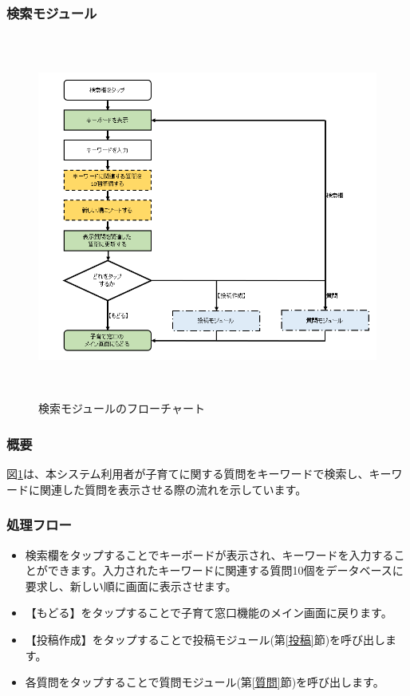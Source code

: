 \documentclass[a4j]{jarticle}
\begin{document}
\subsubsection{検索モジュール\label{検索}} %
\begin{figure}[H]
    \begin{center}
      \includegraphics[height = 12.0cm] {子育て窓口_検索.png} %
    \caption {検索モジュールのフローチャート}
    \label{子育て窓口_検索}
    \end{center}
\end{figure}
\subsubsection*{概要}
図\ref{子育て窓口_検索}は、本システム利用者が子育てに関する質問をキーワードで検索し、キーワードに関連した質問を表示させる際の流れを示しています。
\subsubsection*{処理フロー}
\begin{itemize}
\item 検索欄をタップすることでキーボードが表示され、キーワードを入力することができます。入力されたキーワードに関連する質問10個をデータベースに要求し、新しい順に画面に表示させます。
\item 【もどる】をタップすることで子育て窓口機能のメイン画面に戻ります。
\item 【投稿作成】をタップすることで投稿モジュール(第\ref{投稿}節)を呼び出します。
\item 各質問をタップすることで質問モジュール(第\ref{質問}節)を呼び出します。


\end{itemize}
\end{document}
